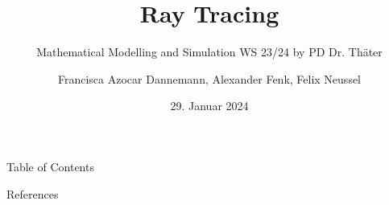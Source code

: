 \documentclass[en]{sdqbeamer}
\title[Ray Tracing]{Ray Tracing}
\subtitle{Mathematical Modelling and Simulation WS 23/24 by PD Dr. Thäter}
\author[Mathematical Modelling and Simulation]{Francisca Azocar Dannemann, Alexander Fenk, Felix Neussel}
\date[29.\,1.\,2024]{29. Januar 2024}
\begin{document}
 
\KITtitleframe

\begin{frame}{Table of Contents}
\tableofcontents
\end{frame}










\begin{frame}{References}

\printbibliography
\end{frame}







\end{document}

